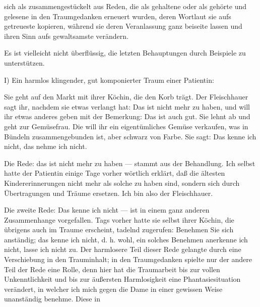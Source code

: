 \documentclass{article}
\begin{document}
         
            
            
            
        \pstart
        sich als zusammengestückelt aus Reden, die als gehaltene oder als
               gehörte und gelesene in den Traumgedanken erneuert wurden, deren Wortlaut sie
               aufs getreueste kopieren, während sie deren Veranlassung ganz beiseite lassen
               und ihren Sinn aufs gewaltsamste verändern.
        \pend
    
            
        \pstart
        Es ist vielleicht nicht überflüssig, die letzten Behauptungen durch Beispiele zu
               unterstützen.
        \pend
    
            
        \pstart
        I) Ein harmlos klingender, gut komponierter Traum einer
               Patientin:
        \pend
    
            
        \pstart
        Sie geht auf den Markt mit ihrer Köchin, die den Korb trägt. Der
                  Fleischhauer sagt ihr, nachdem sie etwas verlangt hat: Das ist nicht mehr zu
                  haben, und will ihr etwas anderes geben mit der Bemerkung: Das ist auch gut. Sie
                  lehnt ab und geht zur Gemüsefrau. Die will ihr ein eigentümliches Gemüse
                  verkaufen, was in Bündeln zusammengebunden ist, aber schwarz von Farbe. Sie sagt:
                  Das kenne ich nicht, das nehme ich nicht.
        \pend
    
            
        \pstart
        Die Rede: das ist nicht mehr zu haben — stammt aus der Behandlung. Ich selbst
               hatte der Patientin einige Tage vorher wörtlich erklärt, daß die ältesten
               Kindererinnerungen nicht mehr als solche zu haben sind, sondern sich durch Übertragungen und Träume ersetzen. Ich bin also der Fleischhauer.
        \pend
    
            
        \pstart
        Die zweite Rede: Das kenne ich nicht — ist in
               einem ganz anderen Zusammenhange vorgefallen. Tags vorher hatte sie selbst
               ihrer Köchin, die übrigens auch im Traume erscheint, tadelnd zugerufen: Benehmen Sie sich anständig; das kenne ich nicht, d.
               h. wohl, ein solches Benehmen anerkenne ich nicht, lasse ich nicht zu. Der
               harmlosere Teil dieser Rede gelangte durch eine Verschiebung in den Trauminhalt;
               in den Traumgedanken spielte nur der andere Teil der Rede eine Rolle, denn
               hier hat die Traumarbeit bis zur vollen Unkenntlichkeit und bis zur äußersten
               Harmlosigkeit eine Phantasiesituation verändert, in welcher ich mich
               gegen die Dame in einer gewissen Weise unanständig
                  benehme. Diese in
        \pend
    
\end{document}
